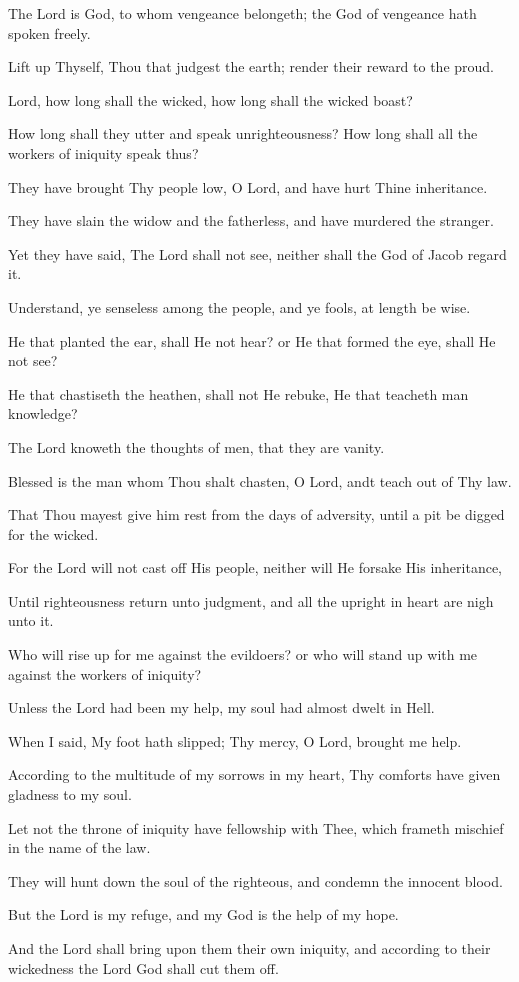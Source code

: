 The Lord is God, to whom vengeance belongeth; the God of vengeance hath spoken freely.

Lift up Thyself, Thou that judgest the earth; render their reward to the proud.

Lord, how long shall the wicked, how long shall the wicked boast?

How long shall they utter and speak unrighteousness? How long shall all the workers of iniquity speak thus?

They have brought Thy people low, O Lord, and have hurt Thine inheritance.

They have slain the widow and the fatherless, and have murdered the stranger.

Yet they have said, The Lord shall not see, neither shall the God of Jacob regard it.

Understand, ye senseless among the people, and ye fools, at length be wise.

He that planted the ear, shall He not hear? or He that formed the eye, shall He not see?

He that chastiseth the heathen, shall not He rebuke, He that teacheth man knowledge?

The Lord knoweth the thoughts of men, that they are vanity.

Blessed is the man whom Thou shalt chasten, O Lord, andt teach out of Thy law.

That Thou mayest give him rest from the days of adversity, until a pit be digged for the wicked.

For the Lord will not cast off His people, neither will He forsake His inheritance,

Until righteousness return unto judgment, and all the upright in heart are nigh unto it.

Who will rise up for me against the evildoers? or who will stand up with me against the workers of iniquity?

Unless the Lord had been my help, my soul had almost dwelt in Hell.

When I said, My foot hath slipped; Thy mercy, O Lord, brought me help.

According to the multitude of my sorrows in my heart, Thy comforts have given gladness to my soul.

Let not the throne of iniquity have fellowship with Thee, which frameth mischief in the name of the law.

They will hunt down the soul of the righteous, and condemn the innocent blood.

But the Lord is my refuge, and my God is the help of my hope.

And the Lord shall bring upon them their own iniquity, and according to their wickedness the Lord God shall cut them off.
